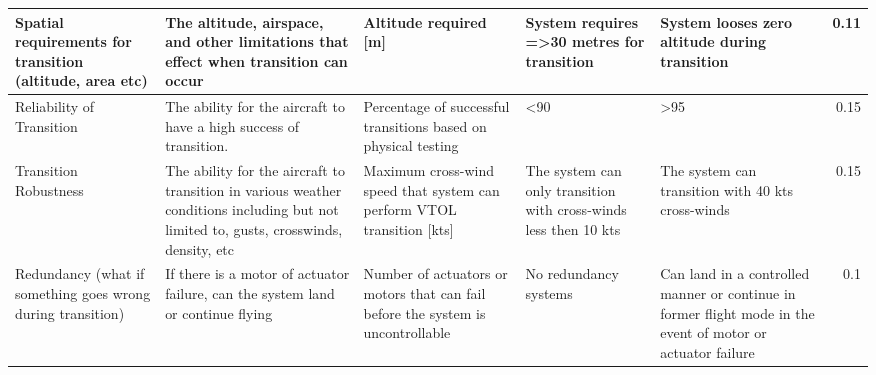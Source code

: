 \begin{table}[]
{\begin{tabular}{|p{2cm}|p{4cm}|p{4cm}|p{4cm}|p{4cm}|r|}
Spatial requirements for transition (altitude, area etc)    & The altitude, airspace, and other limitations that effect when transition can occur                                                    & Altitude required {[}m{]}                                                       & System requires =\textgreater{}30 metres for transition          & System looses zero altitude during transition                                                               & 0.11      \\ \hline
Reliability of Transition                                   & The ability for the aircraft to have a high success of transition.                                                                     & Percentage of successful transitions based on physical testing                  & \textless{}90                                                    & \textgreater{}95                                                                                            & 0.15      \\ \hline
Transition Robustness                                       & The ability for the aircraft to transition in various weather conditions including but not limited to, gusts, crosswinds, density, etc & Maximum cross-wind speed that system can perform VTOL transition {[}kts{]}      & The system can only transition with cross-winds less then 10 kts & The system can transition with 40 kts cross-winds                                                           & 0.15      \\ \hline
Redundancy (what if something goes wrong during transition) & If there is a motor of actuator failure, can the system land or continue flying                                                        & Number of actuators or motors that can fail before the system is uncontrollable & No redundancy systems                                            & Can land in a controlled manner or continue in former flight mode in the event of motor or actuator failure & 0.1       \\ \hline
\end{tabular}%
}
\end{table}





